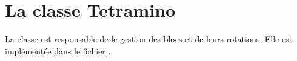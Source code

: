 %
%
%
%
%

\section{La classe Tetramino}
La classe  est responsable de le gestion des blocs et de leurs rotations. Elle est implémentée dans le fichier .

